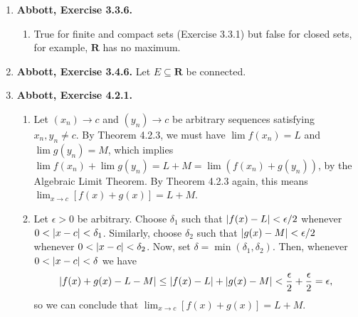 \documentclass{article}
\DeclarePairedDelimiter\abs{\lvert}{\rvert}
\newcommand{\N}{\mathbf{N}}
\newcommand{\R}{\mathbf{R}}
\newcommand{\exc}[2][Abbott]{\item \textbf{#1, Exercise #2.}}
\newcommand{\lep}[1][L]{#1et $\epsilon > 0$ be arbitrary}
\begin{document}
\begin{enumerate}
\begin{enumerate}
        \item False. $[0,1] \cup [1,2] \cup [2,3] \dots$ is not bounded, therefore not compact.
        
        \item False. Let $A = (1,2)$ and $K = [0, 3]$. Then $A \cap K = (1, 2)$, which is not closed, therefore not compact.
        
        \item False. For each $n \in \N$ define 
        \begin{equation*}
            F_n = \bigcup_{k=n}^\infty [2k, 2k+1].
        \end{equation*} To see that every $F_n$ is closed, we use Theorem 3.2.8. Let $(a_n)$ be a Cauchy sequence contained in $F_n$. Then, there is some $N \in \N$ such that $\abs*{a_p-a_q} < 1/2$ for all $p, q \geq N$, thus every term of the sequence is eventually in the same interval $[2k, 2k+1]$ for some $k \geq n$. Since $[2k, 2k+1]$ is closed, the limit of $(a_n)$ is in $[2k, 2k+1]$, therefore it is also in $F_n$, so $F_n$ is closed. Now, assume the intersection $\bigcap_{n=1}^\infty F_n \neq \emptyset$. Then, there is some $x \in \R$ such that $x \in F_n$ for all $n \in N$, in particular $x \in F_1$. Then, there must be some $k \geq 1$ such that $x \in [2k, 2k+1]$. But then, $x \notin F_{k+1}$, which is a contradiction. Hence, we can conclude that $\bigcap_{n=1}^\infty F_n = \emptyset$.
    \end{enumerate}
    
    \exc{3.3.6}
    \begin{enumerate}
        \item True for finite and compact sets (Exercise 3.3.1) but false for closed sets, for example, $\R$ has no maximum.
    \end{enumerate}
    
    \exc{3.4.6}
    Let $E \subseteq \R$ be connected.
    
    \exc{4.2.1}
    \begin{enumerate}
        \item Let $(x_n) \to c$ and $(y_n) \to c$ be arbitrary sequences satisfying $x_n,y_n \neq c$. By Theorem 4.2.3, we must have $\lim{f(x_n)} = L$ and 
        $\lim{g(y_n)} = M$, which implies $\lim{f(x_n)} + \lim {g(y_n)} = L + M = \lim(f(x_n) + g(y_n))$, by the Algebraic Limit Theorem. By Theorem 4.2.3 again, this means $\lim_{x \to c} [f(x)+g(x)] = L + M$.
        
        \item \lep. Choose $\delta_1$ such that $\abs*{f(x)-L} < \epsilon/2$ whenever $0 < \abs*{x-c} < \delta_1$. Similarly, choose $\delta_2$ such that $\abs*{g(x)-M} < \epsilon/2$ whenever $0 < \abs*{x-c} < \delta_2$. Now, set $\delta = \min(\delta_1, \delta_2)$. Then, whenever $0 < \abs*{x-c} < \delta$ we have
        \begin{equation*}
            \abs*{f(x)+g(x)-L-M} \leq \abs*{f(x)-L} + \abs*{g(x)-M} <
            \frac{\epsilon}{2} + \frac{\epsilon}{2} = \epsilon,
        \end{equation*} so we can conclude that $\lim_{x \to c} [f(x) + g(x)] = L + M$.
        

\end{enumerate}
\end{enumerate}
\end{document}
